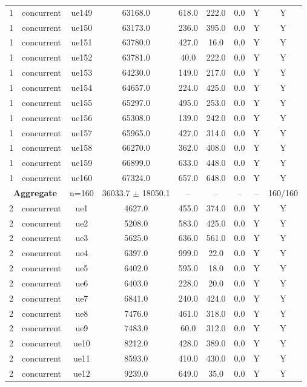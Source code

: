 \begin{table}[ht]
\begin{tabular}{|c|c|c|c|c|c|c|c|c|}
1 & concurrent & ue149 & 63168.0 & 618.0 & 222.0 & 0.0 & Y & Y \\
1 & concurrent & ue150 & 63173.0 & 236.0 & 395.0 & 0.0 & Y & Y \\
1 & concurrent & ue151 & 63780.0 & 427.0 & 16.0 & 0.0 & Y & Y \\
1 & concurrent & ue152 & 63781.0 & 40.0 & 222.0 & 0.0 & Y & Y \\
1 & concurrent & ue153 & 64230.0 & 149.0 & 217.0 & 0.0 & Y & Y \\
1 & concurrent & ue154 & 64657.0 & 224.0 & 425.0 & 0.0 & Y & Y \\
1 & concurrent & ue155 & 65297.0 & 495.0 & 253.0 & 0.0 & Y & Y \\
1 & concurrent & ue156 & 65308.0 & 139.0 & 242.0 & 0.0 & Y & Y \\
1 & concurrent & ue157 & 65965.0 & 427.0 & 314.0 & 0.0 & Y & Y \\
1 & concurrent & ue158 & 66270.0 & 362.0 & 408.0 & 0.0 & Y & Y \\
1 & concurrent & ue159 & 66899.0 & 633.0 & 448.0 & 0.0 & Y & Y \\
1 & concurrent & ue160 & 67324.0 & 657.0 & 648.0 & 0.0 & Y & Y \\
\multicolumn{2}{|c|}{\textbf{Aggregate}} & n=160 & 36033.7 $\pm$ 18050.1 & -- & -- & -- & -- & 160/160 \\
\hline
2 & concurrent & ue1 & 4627.0 & 455.0 & 374.0 & 0.0 & Y & Y \\
2 & concurrent & ue2 & 5208.0 & 583.0 & 425.0 & 0.0 & Y & Y \\
2 & concurrent & ue3 & 5625.0 & 636.0 & 561.0 & 0.0 & Y & Y \\
2 & concurrent & ue4 & 6397.0 & 999.0 & 22.0 & 0.0 & Y & Y \\
2 & concurrent & ue5 & 6402.0 & 595.0 & 18.0 & 0.0 & Y & Y \\
2 & concurrent & ue6 & 6403.0 & 228.0 & 20.0 & 0.0 & Y & Y \\
2 & concurrent & ue7 & 6841.0 & 240.0 & 424.0 & 0.0 & Y & Y \\
2 & concurrent & ue8 & 7476.0 & 461.0 & 318.0 & 0.0 & Y & Y \\
2 & concurrent & ue9 & 7483.0 & 60.0 & 312.0 & 0.0 & Y & Y \\
2 & concurrent & ue10 & 8212.0 & 428.0 & 389.0 & 0.0 & Y & Y \\
2 & concurrent & ue11 & 8593.0 & 410.0 & 430.0 & 0.0 & Y & Y \\
2 & concurrent & ue12 & 9239.0 & 649.0 & 35.0 & 0.0 & Y & Y \\

\end{tabular}
\end{table}
